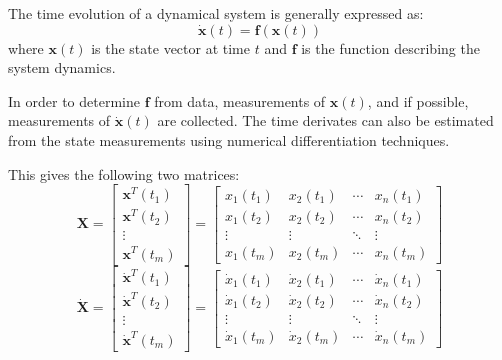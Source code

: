 ﻿\documentclass[12pt,a4paper]{article}
\begin{document}
The time evolution of a dynamical system is generally expressed as:
\begin{equation}
    \dot{\bm{x}}(t) = \bm{f}(\bm{x}(t))
\end{equation}  
where $\bm{x}(t)$ is the state vector at time $t$ and $\bm{f}$ is the function describing
the system dynamics.\par

In order to determine $\bm{f}$ from data, measurements of $\bm{x}(t)$, and if possible,
measurements of $\dot{\bm{x}}(t)$ are collected.
The time derivates can also be estimated from the state measurements using numerical
differentiation techniques.\par

This gives the following two matrices:
\begin{equation}
    \bm{X} = \begin{bmatrix}
    \bm{x}^T(t_1) \\
    \bm{x}^T(t_2) \\
    \vdots \\
    \bm{x}^T(t_m)
    \end{bmatrix}
    = \begin{bmatrix}
    x_1(t_1) & x_2(t_1) & \cdots & x_n(t_1) \\
    x_1(t_2) & x_2(t_2) & \cdots & x_n(t_2) \\
    \vdots & \vdots & \ddots & \vdots \\
    x_1(t_m) & x_2(t_m) & \cdots & x_n(t_m)
    \end{bmatrix}
\end{equation}
\begin{equation}
    \dot{\bm{X}} = \begin{bmatrix}
    \dot{\bm{x}}^T(t_1) \\
    \dot{\bm{x}}^T(t_2) \\
    \vdots \\
    \dot{\bm{x}}^T(t_m)
    \end{bmatrix}
    = \begin{bmatrix}
    \dot{x}_1(t_1) & \dot{x}_2(t_1) & \cdots & \dot{x}_n(t_1) \\
    \dot{x}_1(t_2) & \dot{x}_2(t_2) & \cdots & \dot{x}_n(t_2) \\
    \vdots & \vdots & \ddots & \vdots \\
    \dot{x}_1(t_m) & \dot{x}_2(t_m) & \cdots & \dot{x}_n(t_m)
    \end{bmatrix}
\end{equation}
\end{document}
